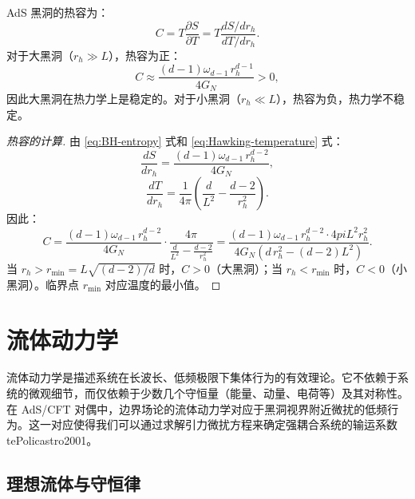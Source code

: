 \begin{theorem}[黑洞热容与稳定性]\label{thm:heat-capacity}
AdS 黑洞的热容为：
\begin{equation}
    C = T\frac{\partial S}{\partial T} = T\frac{dS/dr_h}{dT/dr_h}.
\end{equation}
对于大黑洞（$r_h \gg L$），热容为正：
\begin{equation}
    C \approx \frac{(d-1)\omega_{d-1}\,r_h^{d-1}}{4G_N} > 0,
\end{equation}
因此大黑洞在热力学上是稳定的。对于小黑洞（$r_h \ll L$），热容为负，热力学不稳定。
\end{theorem}

\begin{proof}[热容的计算]
由 \eqref{eq:BH-entropy} 式和 \eqref{eq:Hawking-temperature} 式：
\begin{equation}
    \frac{dS}{dr_h} = \frac{(d-1)\omega_{d-1}\,r_h^{d-2}}{4G_N},
\end{equation}
\begin{equation}
    \frac{dT}{dr_h} = \frac{1}{4\pi}\left(\frac{d}{L^2} - \frac{d-2}{r_h^2}\right).
\end{equation}
因此：
\begin{equation}
    C = \frac{(d-1)\omega_{d-1}\,r_h^{d-2}}{4G_N}\cdot\frac{4\pi}{\frac{d}{L^2} - \frac{d-2}{r_h^2}} = \frac{(d-1)\omega_{d-1}\,r_h^{d-2}\cdot 4pi L^2 r_h^2}{4G_N\left(d\,r_h^2 - (d-2)L^2\right)}.
\end{equation}
当 $r_h > r_{\min} = L\sqrt{(d-2)/d}$ 时，$C > 0$（大黑洞）；当 $r_h < r_{\min}$ 时，$C < 0$（小黑洞）。临界点 $r_{\min}$ 对应温度的最小值。
\end{proof}


\section{流体动力学}

\begin{note}[物理动机]
流体动力学是描述系统在长波长、低频极限下集体行为的有效理论。它不依赖于系统的微观细节，而仅依赖于少数几个守恒量（能量、动量、电荷等）及其对称性。在 AdS/CFT 对偶中，边界场论的流体动力学对应于黑洞视界附近微扰的低频行为。这一对应使得我们可以通过求解引力微扰方程来确定强耦合系统的输运系数 	te{Policastro2001}。
\end{note}

\subsection{理想流体与守恒律}

